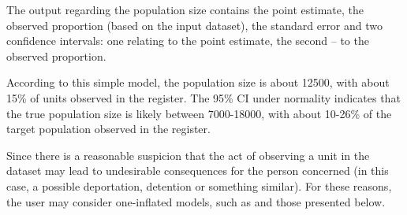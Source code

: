 \documentclass[
]{jss}
\newcommand{\1}{\mathcal{I}} \newcommand{\bZero}{\boldsymbol{0}}
\begin{document}
The output regarding the population size contains the point estimate,
the observed proportion (based on the input dataset), the standard error
and two confidence intervals: one relating to the point estimate, the
second -- to the observed proportion.

According to this simple model, the population size is about 12500, with
about 15\% of units observed in the register. The 95\% CI under
normality indicates that the true population size is likely between
7000-18000, with about 10-26\% of the target population observed in the
register.

Since there is a reasonable suspicion that the act of observing a unit
in the dataset may lead to undesirable consequences for the person
concerned (in this case, a possible deportation, detention or something
similar). For these reasons, the user may consider one-inflated models,
such as  and those presented below.
\end{document}
